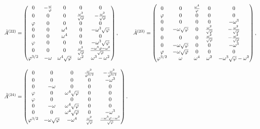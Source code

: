 \begin{align}
  \tilde{A}^{(22)} &= \begin{pmatrix}
    0 & -\frac{\omega}{\varphi} & 0 & 0 & 0 \\
    0 & 0 & 0 & \frac{\omega^2}{\sqrt{\varphi}} & -\frac{\omega^2}{\sqrt{\varphi}} \\
    \varphi & 0 & 0 & 0 & 0 \\
    0 & 0 & \omega^4 & 0 & -\omega^3\sqrt{\varphi} \\
    0 & 0 & \omega^4 & 0 & 0 \\
    \varphi & 0 & 0 & 0 & -\omega^3\sqrt{\varphi} \\
    0 & 0 & 0 & \frac{\omega^2}{\sqrt{\varphi}} & \frac{-\omega^3\varphi-\omega^2}{\sqrt{\varphi}} \\
    \varphi^{3/2} & -\omega & \omega^4 \sqrt{\varphi} & \omega^2 & \omega^3-\omega^2 \\
  \end{pmatrix}, &
  \tilde{A}^{(23)} &= \begin{pmatrix}
    0 & 0 & \frac{\omega^4}{\varphi} & 0 & 0 \\
    \varphi & 0 & 0 & 0 & 0 \\
    0 & 0 & 0 & 0 & -\omega^3 \\
    0 & -\omega\sqrt{\varphi} & 0 & \frac{\omega^2}{\sqrt{\varphi}} & -\frac{\omega^2}{\sqrt{\varphi}} \\
    0 & 0 & 0 & \frac{\omega^2}{\sqrt{\varphi}} & -\frac{\omega^2}{\sqrt{\varphi}} \\
    0 & -\omega\sqrt{\varphi} & 0 & 0 & -\omega^3 \\
    \varphi & -\omega\sqrt{\varphi} & 0 & 0 & 0 \\
    \varphi^{3/2} & \omega & \omega^4 & \omega^2 & -\omega^3\sqrt{\varphi} -\omega^2 \\
  \end{pmatrix}, \notag \\[2ex]
  \tilde{A}^{(24)} &= \begin{pmatrix}
    0 & 0 & 0 & \frac{\omega^2}{\varphi^{3/2}} & -\frac{\omega^2}{\varphi^{3/2}} \\
    0 & 0 & 0 & 0 & -\omega^3 \\
    0 & -\omega & 0 & 0 & 0 \\
    \varphi & 0 & \omega^4 \sqrt{\varphi} & 0 & 0 \\
    \varphi & 0 & 0 & 0 & 0 \\
    0 & -\omega & \omega^4 \sqrt{\varphi} & 0 & 0 \\
    0 & 0 & \omega^4 \sqrt{\varphi} & 0 & -\omega^3 \\
    \varphi^{3/2} & -\omega\sqrt{\varphi} & -\omega^4 & \frac{\omega^2}{\sqrt{\varphi}} & \frac{-\omega^3\varphi-\omega^2}{\sqrt{\varphi}} \\
  \end{pmatrix}.
  \label{eq:2+1d-fib-solution-2}
\end{align}
\endgroup
